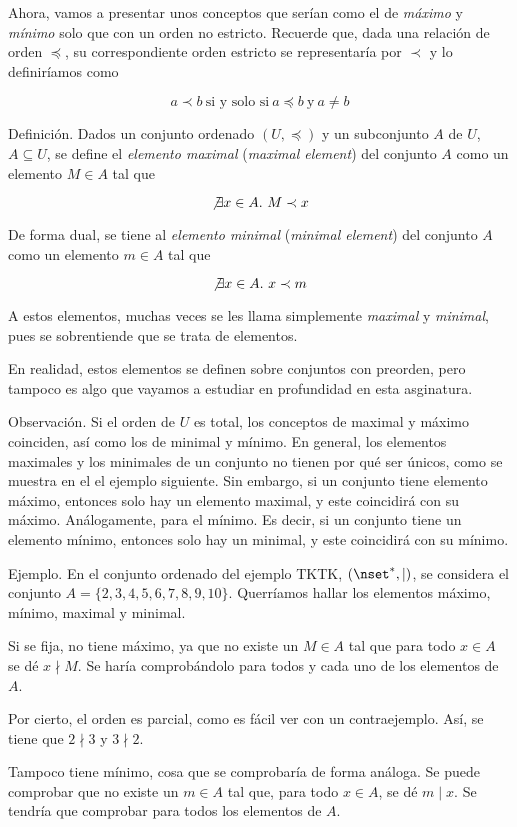 Ahora, vamos a presentar unos conceptos que serían como el de \emph{máximo}
y \emph{mínimo} solo que con un orden no estricto. Recuerde que, dada una
relación de orden $\preceq$, su correspondiente orden estricto se
representaría por $\prec$ y lo definiríamos como

$$ a \prec b \ \text{si y solo si} \ a \preceq b \ \text{y} \ a \neq b $$

Definición. Dados un conjunto ordenado $(U, \preceq)$ y un subconjunto $A$
de $U$, $A \subseteq U$, se define el \emph{elemento maximal} (\emph{maximal
element}) del conjunto $A$ como un elemento $M \in A$ tal que

$$ \not\exists x \in A. \ M \prec x $$

De forma dual, se tiene al \emph{elemento minimal} (\emph{minimal element})
del conjunto $A$ como un elemento $m \in A$ tal que

$$ \not\exists x \in A. \ x \prec m $$

A estos elementos, muchas veces se les llama simplemente \emph{maximal} y
\emph{minimal}, pues se sobrentiende que se trata de elementos.

En realidad, estos elementos se definen sobre conjuntos con preorden, pero
tampoco es algo que vayamos a estudiar en profundidad en esta asginatura.

Observación. Si el orden de $U$ es total, los conceptos de maximal y máximo
coinciden, así como los de minimal y mínimo. En general, los elementos
maximales y los minimales de un conjunto no tienen por qué ser únicos, como
se muestra en el el ejemplo siguiente. Sin embargo, si un conjunto tiene
elemento máximo, entonces solo hay un elemento maximal, y este coincidirá
con su máximo. Análogamente, para el mínimo. Es decir, si un conjunto tiene
un elemento mínimo, entonces solo hay un minimal, y este coincidirá con su
mínimo.

Ejemplo. En el conjunto ordenado del ejemplo TKTK, $(\nset^*, |)$, se
considera el conjunto $A = \{2, 3, 4, 5, 6, 7, 8, 9, 10\}$. Querríamos
hallar los elementos máximo, mínimo, maximal y minimal.

Si se fija, no tiene máximo, ya que no existe un $M \in A$ tal que para todo
$x \in A$ se dé $x \nmid M$. Se haría comprobándolo para todos y cada uno de
los elementos de $A$.

Por cierto, el orden es parcial, como es fácil ver con un contraejemplo.
Así, se tiene que $2 \nmid 3$ y $3 \nmid 2$.

Tampoco tiene mínimo, cosa que se comprobaría de forma análoga. Se puede
comprobar que no existe un $m \in A$ tal que, para todo $x \in A$, se dé $m
\mid x$. Se tendría que comprobar para todos los elementos de $A$.

